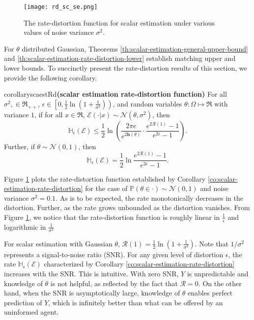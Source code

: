 \documentclass[twoside,11pt]{article}
\def\environment{\mathcal{E}}
\def\regret{\mathcal{R}}
\def\normal{\mathcal{N}}
\def\ratedistortion{\H_\epsilon(\environment)}
\def\diffentropy{\bf h}
\def\H{\mathbb{H}}
\def\diffentropy{\mathbf{h}}
\def\Pr{\mathbb{P}}
\begin{document}
\begin{figure}[!ht]
\centering
\texttt{[image: rd\_sc\_se.png]}
\caption{The rate-distortion function for scalar estimation under various values of noise variance $\sigma^2$.}
\label{fig:scalar-estimation-rate-distortion}
\end{figure}

For $\theta$ distributed Gaussian, Theorems \ref{th:scalar-estimation-general-upper-bound} and \ref{th:scalar-estimation-rate-distortion-lower} establish matching upper and lower bounds. To succinctly present the rate-distortion results of this section, we provide the following corollary.
\begin{restatable}{corollary}{scaestRd}{\bf (scalar estimation rate-distortion function)}
\label{co:scalar-estimation-rate-distortion}
    For all $\sigma^2,  \in \Re_{++}$, $\epsilon \in \left[0, \frac{1}{2}\ln\left(1 + \frac{1}{\sigma^2}\right)\right)$, and random variables $\theta:\Omega\mapsto\Re$ with variance $1$, if for all $x \in \Re$, $\environment(\cdot|x) \sim \normal(\theta, \sigma^2)$, then
    $$\ratedistortion \leq \frac{1}{2}\ln\left(\frac{ 2\pi e}{e^{2\diffentropy(\theta)}} \cdot \frac{e^{2\regret(1)}-1}{e^{2 \epsilon}-1} \right).$$
    Further, if $\theta\sim \mathcal{N}(0, 1)$, then
    $$\ratedistortion = \frac{1}{2}\ln \frac{e^{2\regret(1)}-1}{e^{2 \epsilon}-1}.$$
\end{restatable}

Figure \ref{fig:scalar-estimation-rate-distortion} plots the rate-distortion function established by Corollary \ref{co:scalar-estimation-rate-distortion} for the case of $\Pr(\theta\in\cdot)\sim\mathcal{N}(0, 1)$ and noise variance $\sigma^2 = 0.1$.  As is to be expected, the rate monotonically decreases in the distortion.  Further, as the rate grows unbounded as the distortion vanishes.  From Figure \ref{fig:scalar-estimation-rate-distortion}, we notice that the rate-distortion function is roughly linear in $\frac{1}{\epsilon}$ and logarithmic in $\frac{1}{\sigma^2}$

For scalar estimation with Gaussian $\theta$, $\regret(1) = \frac{1}{2}\ln\left(1 + \frac{1}{\sigma^2}\right)$.  Note that $1/\sigma^2$ represents a signal-to-noise ratio (SNR).  For any given level of distortion $\epsilon$, the rate $\H_\epsilon(\environment)$ characterized by Corollary \ref{co:scalar-estimation-rate-distortion} increases with the SNR.  This is intuitive.  With zero SNR, $Y$ is unpredictable and knowledge of $\theta$ is not helpful, as reflected by the fact that $\regret = 0$.  On the other hand, when the SNR is asymptotically large, knowledge of $\theta$ enables perfect prediction of $Y$, which is infinitely better than what can be offered by an uninformed agent.
\end{document}
